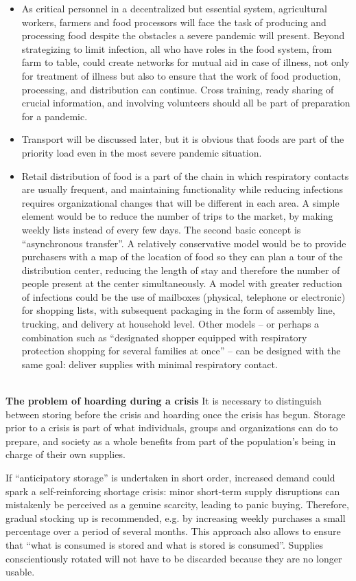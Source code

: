 \documentclass[12pt, a4]{scrartcl}
\begin{document}
\begin{itemize}
	\item As critical personnel in a decentralized but essential system, agricultural workers, farmers and food processors will face the task of producing and processing food despite the obstacles a severe pandemic will present. Beyond strategizing to limit infection, all who have roles in the food system, from farm to table, could create networks for mutual aid in case of illness, not only for treatment of illness but also to ensure that the work of food production, processing, and distribution can continue. Cross training, ready sharing of crucial information, and involving volunteers should all be part of preparation for a pandemic. 
	\item Transport will be discussed later, but it is obvious that foods are part of the priority load even in the most severe pandemic situation.
	\item Retail distribution of food is a part of the chain in which respiratory contacts are usually frequent, and maintaining functionality while reducing infections requires organizational changes that will be different in each area. A simple element would be to reduce the number of trips to the market, by making weekly lists instead of every few days. The second basic concept is “asynchronous transfer”. A relatively conservative model would be to provide purchasers with a map of the location of food so they can plan a tour of the distribution center, reducing the length of stay and therefore the number of people present at the center simultaneously. A model with greater reduction of infections could be the use of mailboxes (physical, telephone or electronic) for shopping lists, with subsequent packaging in the form of assembly line, trucking, and delivery at household level. Other models – or perhaps a combination such as “designated shopper equipped with respiratory protection shopping for several families at once” – can be designed with the same goal: deliver supplies with minimal respiratory contact.
\end{itemize}
\\
\textbf{The problem of hoarding during a crisis}
It is necessary to distinguish between storing before the crisis and hoarding once the crisis has begun. Storage prior to a crisis is part of what individuals, groups and organizations can do to prepare, and society as a whole benefits from part of the population's being in charge of their own supplies.

If “anticipatory storage” is undertaken in short order, increased demand could spark a self-reinforcing shortage crisis: minor short-term supply disruptions can mistakenly be perceived as a genuine scarcity, leading to panic buying. Therefore, gradual stocking up is recommended, e.g. by increasing weekly purchases a small percentage over a period of several months. This approach also allows to ensure that “what is consumed is stored and what is stored is consumed”. Supplies conscientiously rotated will not have to be discarded because they are no longer usable. 
\end{document}
